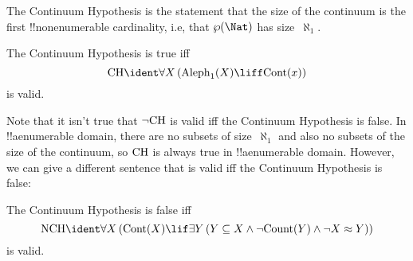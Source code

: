 \documentclass[../../../include/open-logic-section]{subfiles}
\begin{document}
\begin{explain}
The Continuum Hypothesis is the statement that the size of the
continuum is the first !!{nonenumerable} cardinality, i.e, that
$\Pow{\Nat}$ has size~$\aleph_1$. 
\end{explain}

\begin{prop}
The Continuum Hypothesis is true iff \[\fn{CH} \ident
\lforall[X][(\fn{Aleph}_1(X) \liff \fn{Cont}(x))]\] is valid.
\end{prop}

Note that it isn't true that $\lnot \mathrm{CH}$ is valid iff the
Continuum Hypothesis is false. In !!a{enumerable} domain, there are no
subsets of size~$\aleph_1$ and also no subsets of the size of the
continuum, so $\mathrm{CH}$ is always true in !!a{enumerable}
domain. However, we can give a different sentence that is valid iff
the Continuum Hypothesis is false:

\begin{prop}
The Continuum Hypothesis is false iff \[\fn{NCH} \ident
\lforall[X][(\fn{Cont}(X) \lif \lexists[Y][(Y \subseteq X \land \lnot
    \fn{Count}(Y) \land \lnot \cardeq{X}{Y})])]\] is valid.
\end{prop}
\end{document}
